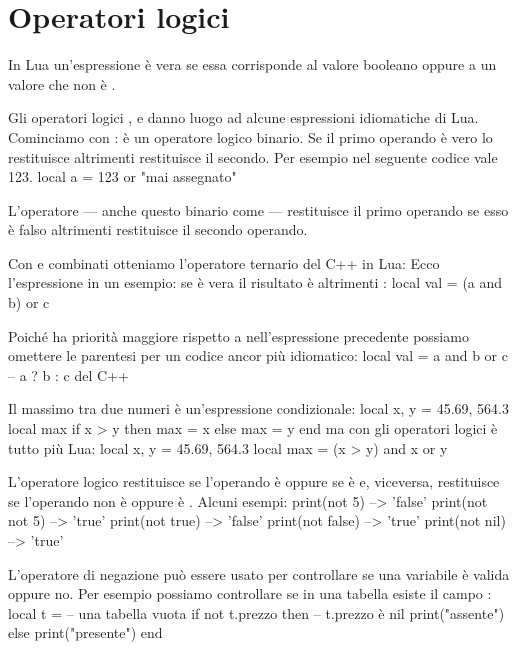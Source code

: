 

\chapter{Operatori logici}

In Lua un'espressione è vera se essa corrisponde al valore booleano 
oppure a un valore che non è .

Gli operatori logici ,  e  danno luogo ad alcune
espressioni idiomatiche di Lua. Cominciamo con : è un operatore logico
binario. Se il primo operando è vero lo restituisce altrimenti restituisce il
secondo. Per esempio nel seguente codice  vale 123.
\lines
local a = 123 or "mai assegnato"
\endlines
{}

L'operatore  --- anche questo binario come  --- restituisce il
primo operando se esso è falso altrimenti restituisce il secondo operando.

Con  e  combinati otteniamo l'operatore ternario del C++ in
Lua: Ecco l'espressione in un esempio: se  è vera il risultato è 
altrimenti :
\lines
local val = (a and b) or c
\endlines
{}

Poiché  ha priorità maggiore rispetto a  nell'espressione
precedente possiamo omettere le parentesi per un codice ancor più idiomatico:
\lines
local val = a and b or c -- a ? b : c del C++
\endlines
{}

Il massimo tra due numeri è un'espressione condizionale:
\lines
local x, y = 45.69, 564.3
local max
if x > y then
    max = x
else
    max = y
end
\endlines
{}
ma con gli operatori logici è tutto più Lua:
\lines
local x, y = 45.69, 564.3
local max = (x > y) and x or y
\endlines
{}

L'operatore logico  restituisce  se l'operando è 
oppure se è  e, viceversa, restituisce  se l'operando non
è  oppure è . Alcuni esempi:
\lines
print(not 5)       --> 'false'
print(not not 5)   --> 'true'
print(not true)    --> 'false'
print(not false)   --> 'true'
print(not nil)     --> 'true'
\endlines
{}

L'operatore di negazione può essere usato per controllare se una variabile è
valida oppure no. Per esempio possiamo controllare se in una tabella esiste il
campo :
\lines
local t = {} -- una tabella vuota
if not t.prezzo then -- t.prezzo è nil
    print("assente")
else
    print("presente")
end

